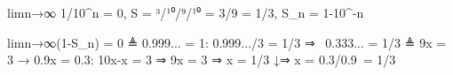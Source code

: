 limn→∞ 1/10^n = 0, S = ³/¹⁰/⁹/¹⁰ = 3/9 = 1/3, S_n = 1-10^-n

limn→∞(1-S_n) = 0 ≜ 0.999... = 1: 0.999.../3 = 1/3 ⇒  0.333... = 1/3 ≜ 9x = 3 → 0.9x = 0.3: 10x-x = 3 ⇒ 9x = 3 ⇒ x = 1/3
                                                                                          ↓⇒ x = 0.3/0.9 = 1/3
                                      
